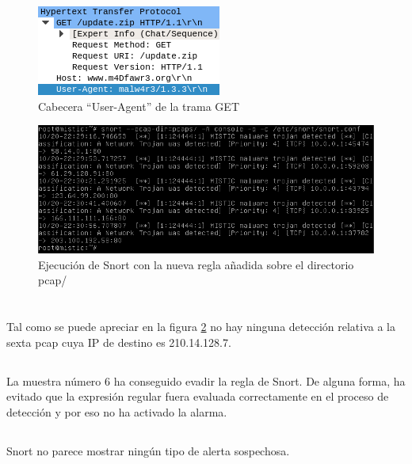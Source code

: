 \documentclass[10pt,a4paper]{article}
\begin{document}
\begin{itemize}
\begin{figure}[h!]
  \centering
  \includegraphics[scale=0.8]{2_1_2.png}
  \caption{Cabecera ``User-Agent'' de la trama GET}
  \label{fig:pcre}
\end{figure}

\end{itemize}

\begin{figure}[h!]
  \centering
  \includegraphics[width=1\textwidth]{2_1.png}
  \caption{Ejecución de Snort con la nueva regla añadida sobre el directorio pcap/}
  \label{fig:snort}
\end{figure}

\pagebreak
\section{}
\subsection{}
Tal como se puede apreciar en la figura \ref{fig:snort} no hay ninguna detección relativa a la sexta pcap cuya IP de destino es 210.14.128.7.
\subsection{}
La muestra número 6 ha conseguido evadir la regla de Snort. De alguna forma, ha evitado que la expresión regular fuera evaluada correctamente en el proceso de detección y por eso no ha activado la alarma.
\subsection{}
Snort no parece mostrar ningún tipo de alerta sospechosa.
\end{document}
